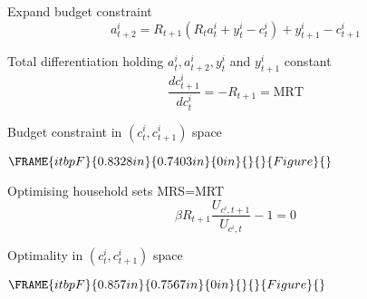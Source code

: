 \documentclass[notes=show]{beamer}
\begin{document}
\begin{frame}%


Expand budget constraint%
\begin{equation*}
a_{t+2}^{i}=R_{t+1}\left( R_{t}a_{t}^{i}+y_{t}^{i}-c_{t}^{i}\right)
+y_{t+1}^{i}-c_{t+1}^{i}
\end{equation*}

Total differentiation holding $a_{t}^{i},a_{t+2}^{i},y_{t}^{i}$ and $%
y_{t+1}^{i}$ constant 
\begin{equation*}
\frac{dc_{t+1}^{i}}{dc_{t}^{i}}=-R_{t+1}=\text{MRT}
\end{equation*}

Budget constraint in $(c_{t}^{i},c_{t+1}^{i})$ space

\begin{center}
$\FRAME{itbpF}{0.8328in}{0.7403in}{0in}{}{}{Figure}{\special{language
"Scientific Word";type "GRAPHIC";maintain-aspect-ratio TRUE;display
"USEDEF";valid_file "T";width 0.8328in;height 0.7403in;depth
0in;original-width 2.6809in;original-height 2.3748in;cropleft "0";croptop
"1";cropright "1";cropbottom "0";tempfilename
'graphics/PEZU5W03.bmp';tempfile-properties "XPR";}}$
\end{center}

\transboxout%
\end{frame}%

\begin{frame}%


Optimising household sets MRS=MRT 
\begin{equation*}
\beta R_{t+1}\frac{U_{c^{i},t+1}}{U_{c^{i},t}}-1=0
\end{equation*}

Optimality in $(c_{t}^{i},c_{t+1}^{i})$ space

\begin{center}
$\FRAME{itbpF}{0.857in}{0.7567in}{0in}{}{}{Figure}{\special{language
"Scientific Word";type "GRAPHIC";maintain-aspect-ratio TRUE;display
"USEDEF";valid_file "T";width 0.857in;height 0.7567in;depth
0in;original-width 2.7639in;original-height 2.431in;cropleft "0";croptop
"1";cropright "1";cropbottom "0";tempfilename
'graphics/PEZU5W04.bmp';tempfile-properties "XPR";}}$
\end{center}

\transboxout%
\end{frame}%
\end{document}
